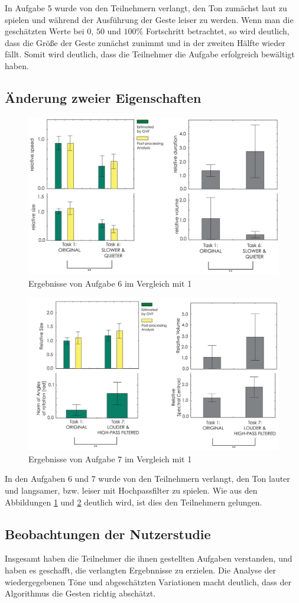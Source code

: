 \documentclass{llncs}
\begin{document}
In Aufgabe 5 wurde von den Teilnehmern verlangt, den Ton zumächst laut zu spielen und während der Ausführung der Geste leiser zu werden. Wenn man die geschätzten Werte bei $0$, $50$ und $100\%$ Fortschritt betrachtet, so wird deutlich, dass die Größe der Geste zunächst zunimmt und in der zweiten Hälfte wieder fällt. Somit wird deutlich, dass die Teilnehmer die Aufgabe erfolgreich bewältigt haben.

\subsection{Änderung zweier Eigenschaften}
\begin{figure}
\centering
\includegraphics[width=0.7\linewidth]{../Bilder/Fig17}
\caption{Ergebnisse von Aufgabe 6 im Vergleich mit 1}
\label{fig:Fig17}
\end{figure}
\begin{figure}
\centering
\includegraphics[width=0.7\linewidth]{../Bilder/Fig18}
\caption{Ergebnisse von Aufgabe 7 im Vergleich mit 1}
\label{fig:Fig18}
\end{figure}

In den Aufgaben 6 und 7 wurde von den Teilnehmern verlangt, den Ton lauter und langsamer, bzw. leiser mit Hochpassfilter zu spielen. Wie aus den Abbildungen \ref{fig:Fig17} und \ref{fig:Fig18} deutlich wird, ist dies den Teilnehmern gelungen.

\subsection{Beobachtungen der Nutzerstudie}
Insgesamt haben die Teilnehmer die ihnen gestellten Aufgaben verstanden, und haben es geschafft, die verlangten Ergebnnisse zu erzielen. Die Analyse der wiedergegebenen Töne und abgeschätzten Variationen macht deutlich, dass der Algorithmus die Gesten richtig abschätzt.



 


\end{document}
